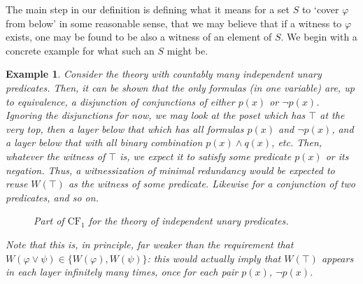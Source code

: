 \documentclass{article}
\newtheorem{example}[theorem]{Example}
\theoremstyle{nonumberplain}
\newcommand{\CF}{\mathrm{CF}}
\begin{document}
\smallskip

The main step in our definition is defining what it means for a set $S$ to `cover $\varphi$ from below' in some reasonable sense, that we may believe that if a witness to $\varphi$ exists, one may be found to be also a witness of an element of $S$. We begin with a concrete example for what such an $S$ might be.

\begin{example}\label{ex:indepunary}
Consider the theory with countably many independent unary predicates. Then, it can be shown that the only formulas (in one variable) are, up to equivalence, a disjunction of conjunctions of either $p(x)$ or $\neg p(x)$. Ignoring the disjunctions for now, we may look at the poset which has $\top$ at the very top, then a layer below that which has all formulas $p(x)$ and $\neg p(x)$, and a layer below that with all binary combination $p(x) \land q(x)$, etc. Then, whatever the witness of $\top$ is, we expect it to satisfy some predicate $p(x)$ or its negation. Thus, a witnessization of minimal redundancy would be expected to reuse $W(\top)$ as the witness of some predicate. Likewise for a conjunction of two predicates, and so on.
\begin{figure}[H]
\centering
{}
\caption{Part of $\CF_1$ for the theory of independent unary predicates.}
\end{figure}

Note that this is, in principle, far weaker than the requirement that $W(\varphi \lor \psi) \in \{W(\varphi), W(\psi)\}$: this would actually imply that $W(\top)$ appears in each layer infinitely many times, once for each pair $p(x)$, $\neg p(x)$.
\end{example}
\end{document}
